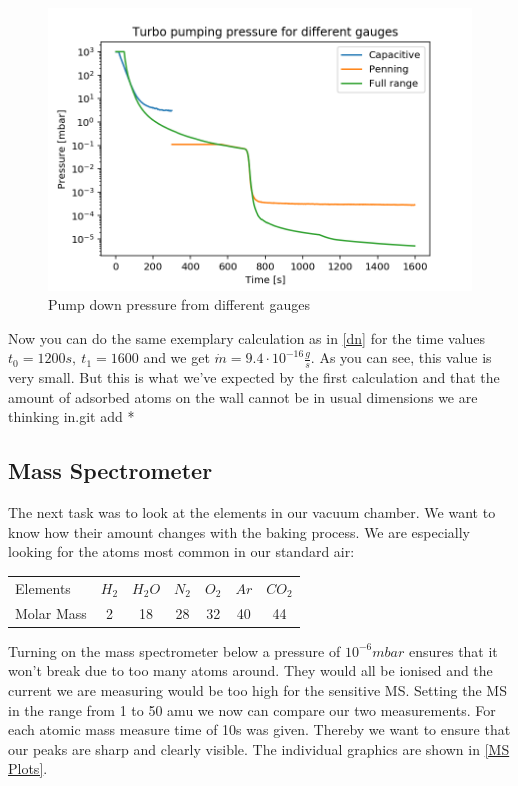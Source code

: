 \documentclass[]{article}
\begin{document}
\begin{figure}[!h]
	\centering
	\includegraphics[width=0.7\linewidth]{Plots/PumpingPressure}
	\caption{Pump down pressure from different gauges}
	\label{fig:pumpingpressure}
\end{figure}

Now you can do the same exemplary calculation as in \ref{dn} for the time values $t_0=1200s, \: t_1=1600$ and we get $ \dot{m} = 9.4\cdot10^{-16} \frac{g}{s}$. 
As you can see, this value is very small. But this is what we've expected by the first calculation and that the amount of adsorbed atoms on the wall cannot be in usual dimensions we are thinking in.git add *



\subsection{Mass Spectrometer}
The next task was to look at the elements in our vacuum chamber. We want to know how their amount changes with the baking process. We are especially looking for the atoms most common in our standard air:

\begin{table}[h]
\centering
\begin{tabular}{lcccccc}
Elements & $H_2$ & $H_2O$ & $N_2$ & $O_2$ & $Ar$ & $CO_2$ \\
Molar Mass & 2 & 18 & 28 & 32 & 40 & 44 \\
\end{tabular} 
\end{table}

Turning on the mass spectrometer below a pressure of $10^{-6} mbar$ ensures that it won't break due to too many atoms around. They would all be ionised and the current we are measuring would be too high for the sensitive MS. Setting the MS in the range from 1 to 50 amu we now can compare our two measurements. For each atomic mass measure time of 10s was given. Thereby we want to ensure that our peaks are sharp and clearly visible. The individual graphics are shown in \ref{MS Plots}.
\end{document}
